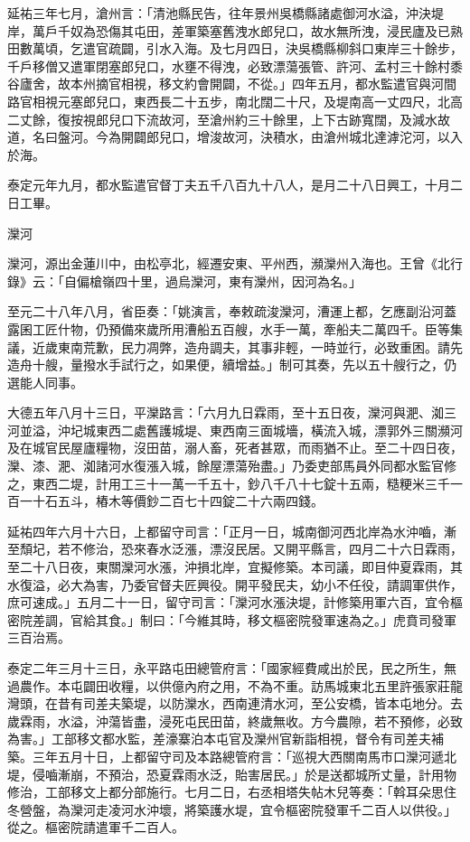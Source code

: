\begin{pinyinscope}
 延祐三年七月，滄州言：「清池縣民告，往年景州吳橋縣諸處御河水溢，沖決堤岸，萬戶千奴為恐傷其屯田，差軍築塞舊洩水郎兒口，故水無所洩，浸民廬及已熟田數萬頃，乞遣官疏闢，引水入海。及七月四日，決吳橋縣柳斜口東岸三十餘步，千戶移僧又遣軍閉塞郎兒口，水壅不得洩，必致漂蕩張管、許河、孟村三十餘村黍谷廬舍，故本州摘官相視，移文約會開闢，不從。」四年五月，都水監遣官與河間路官相視元塞郎兒口，東西長二十五步，南北闊二十尺，及堤南高一丈四尺，北高二丈餘，復按視郎兒口下流故河，至滄州約三十餘里，上下古跡寬闊，及減水故道，名曰盤河。今為開闢郎兒口，增浚故河，決積水，由滄州城北達滹沱河，以入於海。



 泰定元年九月，都水監遣官督丁夫五千八百九十八人，是月二十八日興工，十月二日工畢。



 灤河



 灤河，源出金蓮川中，由松亭北，經遷安東、平州西，瀕灤州入海也。王曾《北行錄》云：「自偏槍嶺四十里，過烏灤河，東有灤州，因河為名。」



 至元二十八年八月，省臣奏：「姚演言，奉敕疏浚灤河，漕運上都，乞應副沿河蓋露囷工匠什物，仍預備來歲所用漕船五百艘，水手一萬，牽船夫二萬四千。臣等集議，近歲東南荒歉，民力凋弊，造舟調夫，其事非輕，一時並行，必致重困。請先造舟十艘，量撥水手試行之，如果便，續增益。」制可其奏，先以五十艘行之，仍選能人同事。



 大德五年八月十三日，平灤路言：「六月九日霖雨，至十五日夜，灤河與淝、洳三河並溢，沖圮城東西二處舊護城堤、東西南三面城墻，橫流入城，漂郭外三關瀕河及在城官民屋廬糧物，沒田苗，溺人畜，死者甚眾，而雨猶不止。至二十四日夜，灤、漆、淝、洳諸河水復漲入城，餘屋漂蕩殆盡。」乃委吏部馬員外同都水監官修之，東西二堤，計用工三十一萬一千五十，鈔八千八十七錠十五兩，糙粳米三千一百一十石五斗，樁木等價鈔二百七十四錠二十六兩四錢。



 延祐四年六月十六日，上都留守司言：「正月一日，城南御河西北岸為水沖嚙，漸至頹圮，若不修治，恐來春水泛漲，漂沒民居。又開平縣言，四月二十六日霖雨，至二十八日夜，東關灤河水漲，沖損北岸，宜擬修築。本司議，即目仲夏霖雨，其水復溢，必大為害，乃委官督夫匠興役。開平發民夫，幼小不任役，請調軍供作，庶可速成。」五月二十一日，留守司言：「灤河水漲決堤，計修築用軍六百，宜令樞密院差調，官給其食。」制曰：「今維其時，移文樞密院發軍速為之。」虎賁司發軍三百治焉。



 泰定二年三月十三日，永平路屯田總管府言：「國家經費咸出於民，民之所生，無過農作。本屯闢田收糧，以供億內府之用，不為不重。訪馬城東北五里許張家莊龍灣頭，在昔有司差夫築堤，以防灤水，西南連清水河，至公安橋，皆本屯地分。去歲霖雨，水溢，沖蕩皆盡，浸死屯民田苗，終歲無收。方今農隙，若不預修，必致為害。」工部移文都水監，差濠寨泊本屯官及灤州官新詣相視，督令有司差夫補築。三年五月十日，上都留守司及本路總管府言：「巡視大西關南馬市口灤河遞北堤，侵嚙漸崩，不預治，恐夏霖雨水泛，貽害居民。」於是送都城所丈量，計用物修治，工部移文上都分部施行。七月二日，右丞相塔失帖木兒等奏：「斡耳朵思住冬營盤，為灤河走凌河水沖壞，將築護水堤，宜令樞密院發軍千二百人以供役。」從之。樞密院請遣軍千二百人。




\end{pinyinscope}
